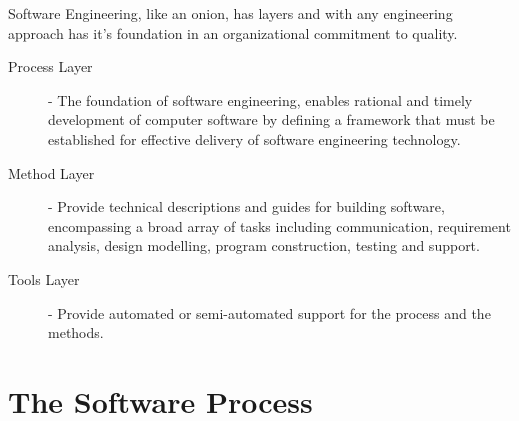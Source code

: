\documentclass[12pt letter]{report}
\begin{document}
Software Engineering, like an onion, has layers and with any engineering approach has it's foundation in an
organizational commitment to quality.
\begin{description}
  \item[Process Layer]  - The foundation of software engineering, enables rational and timely development of computer
        software by defining a framework that must be established for effective delivery of software engineering
        technology.
  \item[Method Layer] - Provide technical descriptions and guides for building software, encompassing a broad array of
        tasks including communication, requirement analysis, design modelling, program construction, testing and support.
  \item[Tools Layer] - Provide automated or semi-automated support for the process and the methods.
\end{description}

\section{The Software Process}
\end{document}
